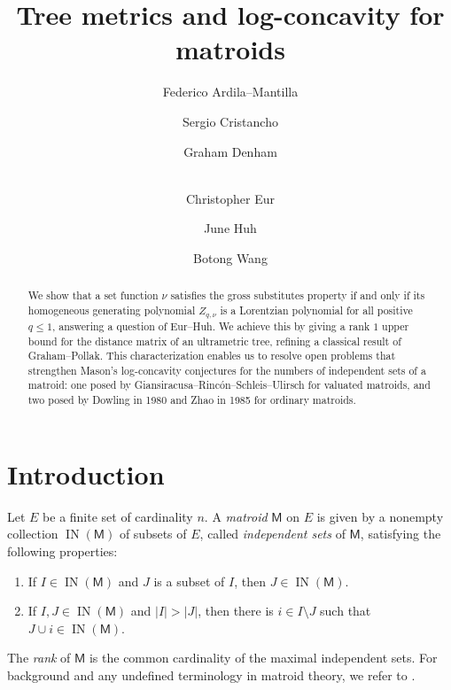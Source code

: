 \documentclass{amsart}
\theoremstyle{definition}
\theoremstyle{remark}
\newcommand{\abs}[1]{\left|#1\right|}               %
\newcommand{\M}{\mathsf{M}}    %
\DeclareMathOperator{\IN}{{IN}}
\newcommand{\1}{\mathbf{1}}
\numberwithin{equation}{section}
\begin{document}

\title{Tree metrics and log-concavity for matroids}
\author{Federico Ardila--Mantilla} 
\address{%
  Queen Mary University of London and San Francisco State University}
  \author{Sergio Cristancho} 
\address{Princeton University} 
\author{Graham Denham} %
 \address{University of Western Ontario} 
\author{\\ Christopher Eur} 
\address{Carnegie Mellon University} 
\author{June Huh} %
\address{Princeton University and Korea Institute for Advanced Study} 
\author{Botong Wang} 
\address{University of Wisconsin-Madison} 

\renewcommand{\shortauthors}{F.~Ardila--Mantilla, S.~Cristancho, G.~Denham, C.~Eur, J.~Huh, B.~Wang}

\begin{abstract}
We show that a set function $\nu$ 
  satisfies the gross substitutes property if and only if its homogeneous generating polynomial $Z_{q,\nu}$ is a Lorentzian polynomial  for all positive $q \le 1$, answering a question of Eur--Huh. We achieve this by giving a rank $1$ upper bound for the distance matrix of an ultrametric tree, refining a classical result of Graham--Pollak.
  This characterization enables us to resolve open problems that strengthen Mason’s log-concavity conjectures for the numbers of independent sets of a matroid:  one posed by Giansiracusa–Rinc\'on–Schleis–Ulirsch for valuated matroids, and two posed by Dowling in 1980 and Zhao in 1985 for ordinary matroids.
\end{abstract}


\maketitle



\section{\textsf{Introduction}}


Let $E$ be a finite set of cardinality $n$. 
 A \emph{matroid} $\M$ on $E$ is given by a nonempty collection $\IN(\M)$ of subsets of $E$, called \emph{independent sets} of $\M$, satisfying the following properties:
\begin{enumerate}[(1)]\itemsep 5pt
\item If $I\in \IN(\M)$ and $J$ is a subset of $I$, then $J\in \IN(\M)$.
\item If $I,J\in \IN(\M)$ and $\abs{I} > \abs{J}$, then there is $i\in I\setminus J$ such that $J\cup i \in \IN(\M)$.
\end{enumerate}
The \emph{rank} of $\M$ is the common cardinality of the maximal independent sets. For background and any undefined terminology in matroid theory, we refer to \cite{OxleyMatroidTheory}.
\end{document}
